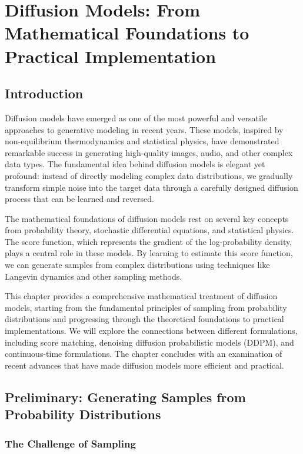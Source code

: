 \chapter{Diffusion Models: From Mathematical Foundations to Practical Implementation}

\section{Introduction}

Diffusion models have emerged as one of the most powerful and versatile approaches to generative modeling in recent years. These models, inspired by non-equilibrium thermodynamics and statistical physics, have demonstrated remarkable success in generating high-quality images, audio, and other complex data types. The fundamental idea behind diffusion models is elegant yet profound: instead of directly modeling complex data distributions, we gradually transform simple noise into the target data through a carefully designed diffusion process that can be learned and reversed.

The mathematical foundations of diffusion models rest on several key concepts from probability theory, stochastic differential equations, and statistical physics. The score function, which represents the gradient of the log-probability density, plays a central role in these models. By learning to estimate this score function, we can generate samples from complex distributions using techniques like Langevin dynamics and other sampling methods.

This chapter provides a comprehensive mathematical treatment of diffusion models, starting from the fundamental principles of sampling from probability distributions and progressing through the theoretical foundations to practical implementations. We will explore the connections between different formulations, including score matching, denoising diffusion probabilistic models (DDPM), and continuous-time formulations. The chapter concludes with an examination of recent advances that have made diffusion models more efficient and practical.

\section{Preliminary: Generating Samples from Probability Distributions}

\subsection{The Challenge of Sampling}

